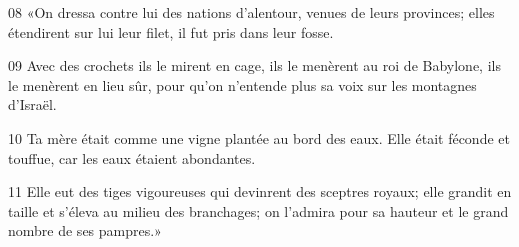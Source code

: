 
08 «On dressa contre lui des nations d’alentour, venues de leurs provinces; elles étendirent sur lui leur filet, il fut pris dans leur fosse.

09 Avec des crochets ils le mirent en cage, ils le menèrent au roi de Babylone, ils le menèrent en lieu sûr, pour qu’on n’entende plus sa voix sur les montagnes d’Israël.

10 Ta mère était comme une vigne plantée au bord des eaux. Elle était féconde et touffue, car les eaux étaient abondantes.

11 Elle eut des tiges vigoureuses qui devinrent des sceptres royaux; elle grandit en taille et s’éleva au milieu des branchages; on l’admira pour sa hauteur et le grand nombre de ses pampres.»
